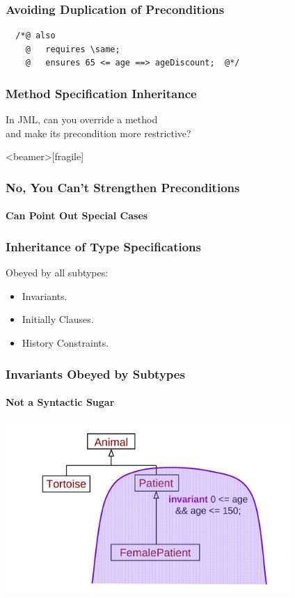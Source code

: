\begin{frame}[fragile]
\frametitle{Avoiding Duplication of Preconditions}

\begin{lstlisting}
  /*@ also
    @   requires \same;
    @   ensures 65 <= age ==> ageDiscount;  @*/
\end{lstlisting}
\end{frame}

\begin{frame}
\frametitle{Method Specification Inheritance}
\begin{question}
In JML, can you override a method \\
and make its precondition more restrictive?
\end{question}
\end{frame}

\begin{frame}<beamer>[fragile]
\frametitle{No, You Can't Strengthen Preconditions}
\framesubtitle{Can Point Out Special Cases}



\end{frame}


\begin{frame}
\frametitle{Inheritance of Type Specifications}

Obeyed by all subtypes:
\begin{itemize}
\item
Invariants.

\item
Initially Clauses.

\item
History Constraints.
\end{itemize}
\end{frame}

\begin{frame}
\frametitle{Invariants Obeyed by Subtypes}
\framesubtitle{Not a Syntactic Sugar}
\includegraphics[width=4.25in]{invariant-inh}
\end{frame}

